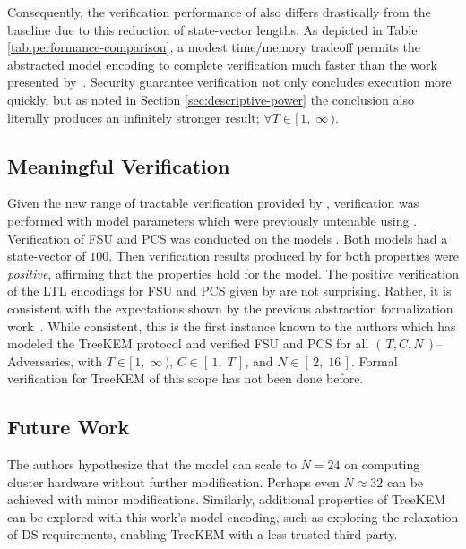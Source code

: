 \documentclass[runningheads]{llncs}
\newcommand{\Abrev}[1]{\gls{#1}}
\newcommand{\NumericRange}[2]{\ensuremath{\left[\,#1,\; #2\,\right]}\xspace}
\newcommand{\NumericRangeOpenR}[2]{\ensuremath{[\,#1,\; #2\,)}\xspace}
\begin{document}
Consequently, the verification performance of  also differs drastically from the baseline  due to this reduction of state-vector lengths.
As depicted in Table \ref{tab:performance-comparison}, a modest time/memory tradeoff permits the abstracted model encoding to complete verification much faster than the work presented by~\cite{washburn2022formal}.
Security guarantee verification not only concludes execution more quickly, but as noted in Section \ref{sec:descriptive-power} the conclusion also literally produces an infinitely stronger result; $\forall T \in \NumericRangeOpenR{1}{\infty}$.


\subsection{Meaningful Verification}

Given the new range of tractable verification provided by , verification was performed with model parameters which were previously untenable using . 
Verification of  \Abrev{FSU} and \Abrev{PCS} was conducted on the models .
Both models had a state-vector of $100$\siBytes.
Then verification results produced by   for both properties were \emph{positive}, affirming that the properties hold for the model.
The positive verification of the LTL encodings for \Abrev{FSU} and \Abrev{PCS} given by  are not surprising.
Rather, it is consistent with the expectations shown by the previous \CGKAdef abstraction formalization work~\cite{alwen2020security}.
While consistent, this is the first instance known to the authors which has modeled the TreeKEM protocol and verified \Abrev{FSU} and \Abrev{PCS} for all $(\,T, C, N\,)$--Adversaries, with $T \in \NumericRangeOpenR{1}{\infty}$, $C \in \NumericRange{1}{T}$, and $N \in \NumericRange{2}{16}$.
Formal verification for TreeKEM of this scope has not been done before.


\subsection{Future Work}

The authors hypothesize that the model   can scale to $N = 24$ on computing cluster hardware without further modification.
Perhaps even $N \approx 32$ can be achieved with minor modifications.
Similarly, additional properties of TreeKEM can be explored with this work's model encoding, such as exploring the relaxation of  \Abrev{DS} requirements, enabling TreeKEM with a less trusted third party.
\end{document}
